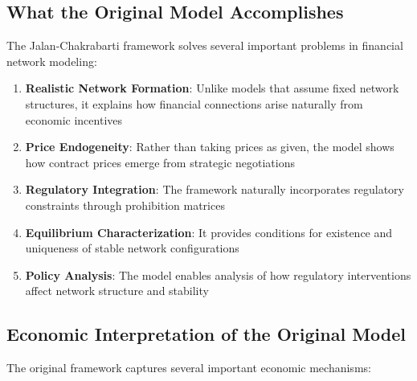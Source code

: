 \subsection{What the Original Model Accomplishes}

The Jalan-Chakrabarti framework solves several important problems in financial network modeling:

\begin{enumerate}
   \item \textbf{Realistic Network Formation}: Unlike models that assume fixed network structures, it explains how financial connections arise naturally from economic incentives
   
   \item \textbf{Price Endogeneity}: Rather than taking prices as given, the model shows how contract prices emerge from strategic negotiations
   
   \item \textbf{Regulatory Integration}: The framework naturally incorporates regulatory constraints through prohibition matrices
   
   \item \textbf{Equilibrium Characterization}: It provides conditions for existence and uniqueness of stable network configurations
   
   \item \textbf{Policy Analysis}: The model enables analysis of how regulatory interventions affect network structure and stability
\end{enumerate}

\subsection{Economic Interpretation of the Original Model}

The original framework captures several important economic mechanisms:

